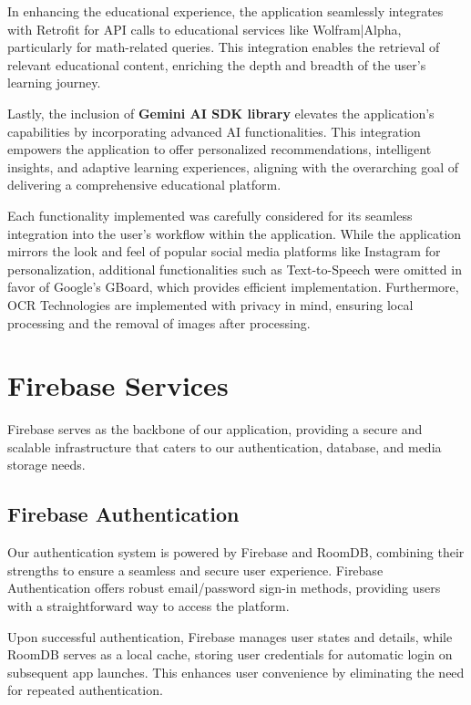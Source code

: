 In enhancing the educational experience, the application seamlessly integrates with Retrofit for API calls to educational services like Wolfram|Alpha, particularly for math-related queries. This integration enables the retrieval of relevant educational content, enriching the depth and breadth of the user's learning journey.

Lastly, the inclusion of \textbf{Gemini AI SDK library} elevates the application's capabilities by incorporating advanced AI functionalities. This integration empowers the application to offer personalized recommendations, intelligent insights, and adaptive learning experiences, aligning with the overarching goal of delivering a comprehensive educational platform.

Each functionality implemented was carefully considered for its seamless integration into the user's workflow within the application. While the application mirrors the look and feel of popular social media platforms like Instagram for personalization, additional functionalities such as Text-to-Speech were omitted in favor of Google's GBoard, which provides efficient implementation. Furthermore, OCR Technologies are implemented with privacy in mind, ensuring local processing and the removal of images after processing.


\section{Firebase Services}

Firebase serves as the backbone of our application, providing a secure and scalable infrastructure that caters to our authentication, database, and media storage needs.

\subsection{Firebase Authentication}

Our authentication system is powered by Firebase and RoomDB, combining their strengths to ensure a seamless and secure user experience. Firebase Authentication offers robust email/password sign-in methods, providing users with a straightforward way to access the platform.

Upon successful authentication, Firebase manages user states and details, while RoomDB serves as a local cache, storing user credentials for automatic login on subsequent app launches. This enhances user convenience by eliminating the need for repeated authentication.

